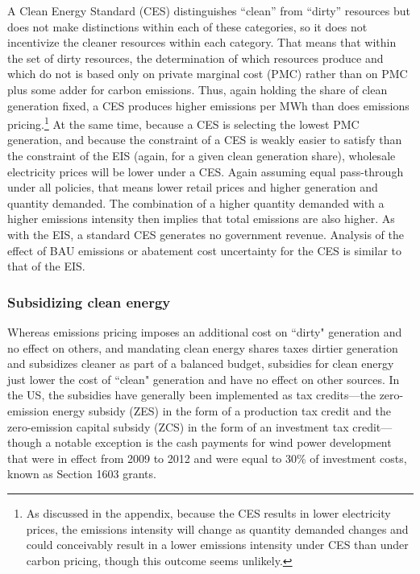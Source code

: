 \documentclass[12pt]{article}
\begin{document}
A Clean Energy Standard (CES) distinguishes ``clean'' from ``dirty'' resources but does not make distinctions within each of these categories, so it does not incentivize the cleaner resources within each category. That means that within the set of dirty resources, the determination of which resources produce and which do not is based only on private marginal cost (PMC) rather than on PMC plus some adder for carbon emissions.  Thus, again holding the share of clean generation fixed, a CES produces higher emissions per MWh than does emissions pricing.\footnote{As discussed in the appendix, because the CES results in lower electricity prices, the emissions intensity will change as quantity demanded changes and could conceivably result in a lower emissions intensity under CES than under carbon pricing, though this outcome seems unlikely.} At the same time, because a CES is selecting the lowest PMC generation, and because the constraint of a CES is weakly easier to satisfy than the constraint of the EIS (again, for a given clean generation share), wholesale electricity prices will be lower under a CES. Again assuming equal pass-through under all policies, that means lower retail prices and higher generation and quantity demanded. The combination of a higher quantity demanded with a higher emissions intensity then implies that total emissions are also higher.  As with the EIS, a standard CES generates no government revenue.  Analysis of the effect of BAU emissions or abatement cost uncertainty for the CES is similar to that of the EIS.


\subsubsection{Subsidizing clean energy}

Whereas emissions pricing imposes an additional cost on ``dirty" generation and no effect on others, and mandating clean energy shares taxes dirtier generation and subsidizes cleaner as part of a balanced budget, subsidies for clean energy just lower the cost of ``clean" generation and have no effect on other sources.  In the US, the subsidies have generally been implemented as tax credits---the zero-emission energy subsidy (ZES) in the form of a production tax credit and the zero-emission capital subsidy (ZCS) in the form of an investment tax credit---though a notable exception is the cash payments for wind power development that were in effect from 2009 to 2012 and were equal to 30\% of investment costs, known as Section 1603 grants.
\end{document}
